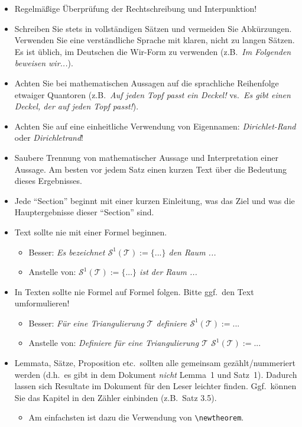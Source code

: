 \documentclass[a4paper,11pt,bibliography=totoc,listof=totoc,headinclude=true,cleardoublepage=empty,oneside]{scrbook}
\begin{document}
{\color{change}
\begin{itemize}

\item Regelmäßige Überprüfung der Rechtschreibung und Interpunktion!
\item Schreiben Sie stets in vollständigen Sätzen und vermeiden Sie Abkürzungen.  Verwenden Sie eine verständliche Sprache mit klaren, nicht zu langen Sätzen. Es ist üblich, im Deutschen die Wir-Form zu verwenden (z.B.\ \emph{Im Folgenden beweisen wir...}).

\item Achten Sie bei mathematischen Aussagen auf die sprachliche Reihenfolge etwaiger Quantoren (z.B.\ \emph{Auf jeden Topf passt ein Deckel!} vs.\ \emph{Es gibt einen Deckel, der auf jeden Topf passt!}).

\item Achten Sie auf eine einheitliche Verwendung von Eigennamen: \emph{Dirichlet-Rand} oder \emph{Dirichletrand}!

\item Saubere Trennung von mathematischer Aussage und Interpretation einer Aussage. Am besten vor jedem Satz einen kurzen Text über die Bedeutung dieses Ergebnisses.
\item Jede "`Section"' beginnt mit einer kurzen Einleitung, was das Ziel und was die Hauptergebnisse dieser "`Section"' sind.

\item Text sollte nie mit einer Formel beginnen.
\begin{itemize}
\item Besser: \emph{Es bezeichnet $\mathcal{S}^1(\mathcal{T}) := \big\{ ... \big\}$ den Raum ...}
\item Anstelle von: \emph{$\mathcal{S}^1(\mathcal{T}) := \big\{ ... \big\}$ ist der Raum ...}
\end{itemize}

\item In Texten sollte nie Formel auf Formel folgen. Bitte ggf.\ den Text umformulieren!
\begin{itemize}
\item Besser: \emph{Für eine Triangulierung $\mathcal{T}$ definiere $\mathcal{S}^1(\mathcal{T}) := ...$}
\item Anstelle von: \emph{Definiere für eine Triangulierung $\mathcal{T}$ $\mathcal{S}^1(\mathcal{T}) := ...$}
\end{itemize}

\item Lemmata, Sätze, Proposition etc.\ sollten alle gemeinsam gezählt/nummeriert werden (d.h.\ es gibt in dem Dokument \emph{nicht} Lemma~1 und Satz~1). Dadurch lassen sich Resultate im Dokument für den Leser leichter finden. Ggf.\ können Sie das Kapitel in den Zähler einbinden (z.B.\ Satz 3.5).
\begin{itemize}
\item Am einfachsten ist dazu die Verwendung von \verb$\newtheorem$.
\end{itemize}


\end{itemize}}
\end{document}

